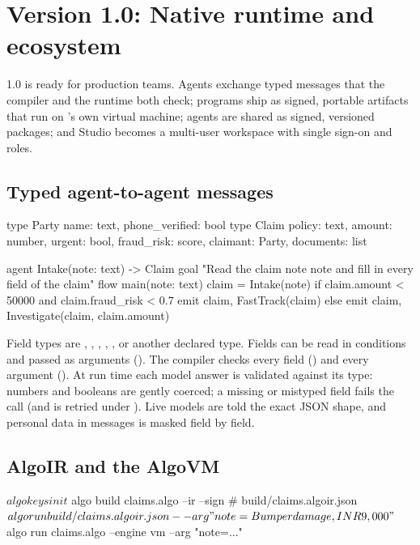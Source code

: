 \chapter{Version 1.0: Native runtime and ecosystem}
\label{ch:v10}

\algolang{} 1.0 is ready for production teams. Agents exchange typed messages that the compiler and the runtime both check; programs ship as signed, portable artifacts that run on \algolang{}'s own virtual machine; agents are shared as signed, versioned packages; and Studio becomes a multi-user workspace with single sign-on and roles.

\section{Typed agent-to-agent messages}

\begin{algo}[title=examples/v10/claims\_typed.algo (excerpt)]
type Party { name: text, phone_verified: bool }
type Claim { policy: text, amount: number, urgent: bool, fraud_risk: score, claimant: Party, documents: list }

agent Intake(note: text) -> Claim {
    goal "Read the claim note {note} and fill in every field of the claim"
}
flow main(note: text) {
    claim = Intake(note)
    if claim.amount < 50000 and claim.fraud_risk < 0.7 { emit claim, FastTrack(claim) }
    else { emit claim, Investigate(claim, claim.amount) }
}
\end{algo}

Field types are , , , , ,  or another declared type. Fields can be read in conditions and passed as arguments (). The compiler checks every field () and every argument (). At run time each model answer is validated against its type: numbers and booleans are gently coerced; a missing or mistyped field fails the call (and is retried under ). Live models are told the exact JSON shape, and personal data in messages is masked field by field.

\section{AlgoIR and the AlgoVM}

\begin{terminal}
$ algo keys init
$ algo build claims.algo --ir --sign              # build/claims.algoir.json
$ algo run build/claims.algoir.json --arg "note=Bumper damage, INR 9,000"
$ algo run claims.algo --engine vm --arg "note=..."
\end{terminal}

